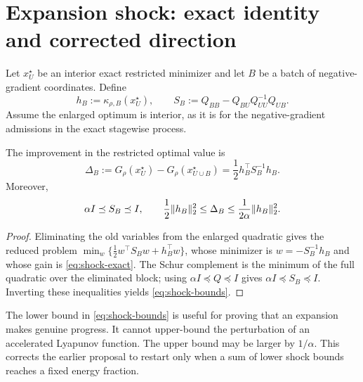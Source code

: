 \section{Expansion shock: exact identity and corrected direction}
\label{sec:shock}

Let $x_U^\star$ be an interior exact restricted minimizer and let $B$ be a
batch of negative-gradient coordinates.  Define
\begin{equation}
 h_B:=\kappa_{\rho,B}(x_U^\star),
 \qquad
 S_B:=Q_{BB}-Q_{BU}Q_{UU}^{-1}Q_{UB}.
 \label{eq:schur}
\end{equation}
Assume the enlarged optimum is interior, as it is for the negative-gradient
admissions in the exact stagewise process.

\begin{proposition}
\label{prop:shock}
The improvement in the restricted optimal value is
\begin{equation}
 \Delta_B
 :=G_\rho(x_U^\star)-G_\rho(x_{U\cup B}^\star)
 =\frac12h_B^\top S_B^{-1}h_B.
 \label{eq:shock-exact}
\end{equation}
Moreover,
\begin{equation}
  \alpha I\preceq S_B\preceq I,
  \qquad
  \frac12\lVert h_B\rVert_2^2
  \leq\Delta_B
  \leq\frac1{2\alpha}\lVert h_B\rVert_2^2.
  \label{eq:shock-bounds}
\end{equation}
\end{proposition}

\begin{proof}
Eliminating the old variables from the enlarged quadratic gives the reduced
problem
$\min_w\{\frac12w^\top S_Bw+h_B^\top w\}$, whose minimizer is
$w=-S_B^{-1}h_B$ and whose gain is \cref{eq:shock-exact}.  The Schur
complement is the minimum of the full quadratic over the eliminated block;
using $\alpha I\preceq Q\preceq I$ gives
$\alpha I\preceq S_B\preceq I$.  Inverting these inequalities yields
\cref{eq:shock-bounds}.
\end{proof}

The lower bound in \cref{eq:shock-bounds} is useful for proving that an
expansion makes genuine progress.  It cannot upper-bound the perturbation of
an accelerated Lyapunov function.  The upper bound may be larger by
$1/\alpha$.  This corrects the earlier proposal to restart only when a sum of
lower shock bounds reaches a fixed energy fraction.
